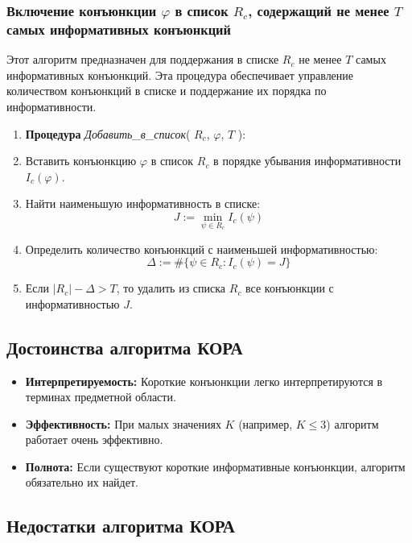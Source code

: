 \subsubsection{Включение конъюнкции \(\varphi\) в список \(R_c\), содержащий не менее \(T\) самых информативных конъюнкций}

Этот алгоритм предназначен для поддержания в списке \(R_c\) не менее \(T\) самых информативных конъюнкций. Эта процедура обеспечивает управление количеством конъюнкций в списке и поддержание их порядка по информативности.

\begin{enumerate}
    \item \textbf{Процедура} \textit{Добавить\_в\_список}( \(R_c\), \(\varphi\), \(T\) ):
    \item Вставить конъюнкцию \(\varphi\) в список \(R_c\) в порядке убывания информативности \(I_c(\varphi)\).
    \item Найти наименьшую информативность в списке:
          \[
              J := \min_{\psi \in R_c} I_c(\psi)
          \]
    \item Определить количество конъюнкций с наименьшей информативностью:
          \[
              \Delta := \#\{ \psi \in R_c : I_c(\psi) = J \}
          \]
    \item Если \(|R_c| - \Delta > T\), то удалить из списка \(R_c\) все конъюнкции с информативностью \(J\).
\end{enumerate}

\subsection{Достоинства алгоритма КОРА}

\begin{itemize}
    \item \textbf{Интерпретируемость:} Короткие конъюнкции легко интерпретируются в терминах предметной области.
    \item \textbf{Эффективность:} При малых значениях \(K\) (например, \(K \leq 3\)) алгоритм работает очень эффективно.
    \item \textbf{Полнота:} Если существуют короткие информативные конъюнкции, алгоритм обязательно их найдет.
\end{itemize}

\subsection{Недостатки алгоритма КОРА}

